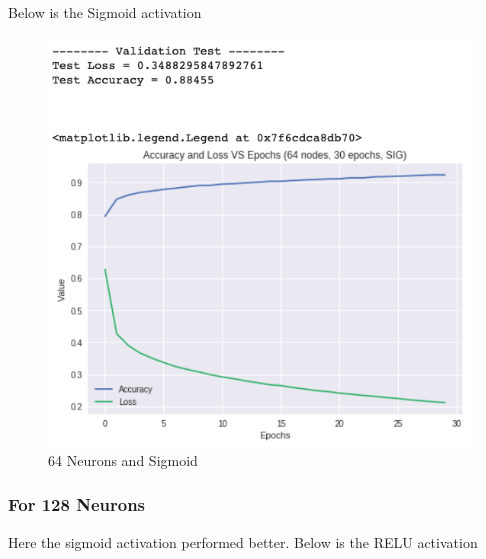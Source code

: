 \documentclass[a4paper, 12pt]{article}
\begin{document}
    Below is the Sigmoid activation
    
    \begin{figure}[h!]
        \centering
        \captionsetup{justification=centering}
        \includegraphics[scale = 0.3]{64_SIG.png}
        \caption{64 Neurons and Sigmoid}
    \end{figure}

    \pagebreak
    \subsubsection{For 128 Neurons}

    Here the sigmoid activation performed better. Below is the RELU activation
\end{document}
